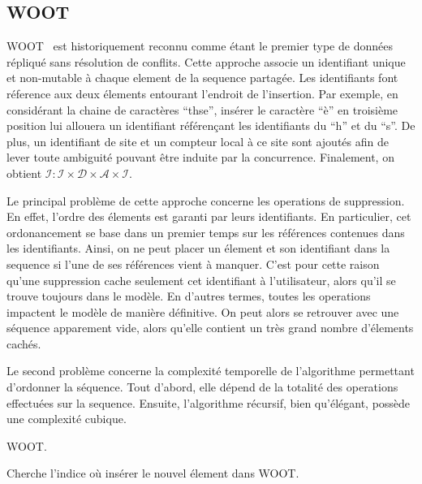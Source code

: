 
\subsection{WOOT}

WOOT~\cite{oster2006data} est historiquement reconnu comme étant le premier
type de données répliqué sans résolution de conflits. Cette approche associe un
identifiant unique et non-mutable à chaque element de la sequence partagée. Les
identifiants font réference aux deux élements entourant l'endroit de
l'insertion. Par exemple, en considérant la chaine de caractères ``thse'',
insérer le caractère ``è'' en troisième position lui allouera un identifiant
référençant les identifiants du ``h'' et du ``s''. De plus, un identifiant de
site et un compteur local à ce site sont ajoutés afin de lever toute ambiguité
pouvant être induite par la concurrence. Finalement, on obtient
$\mathcal{I}: \mathcal{I} \times \mathcal{D} \times \mathcal{A} \times
\mathcal{I}$.

Le principal problème de cette approche concerne les operations de suppression.
En effet, l'ordre des élements est garanti par leurs identifiants. En
particulier, cet ordonancement se base dans un premier temps sur les références
contenues dans les identifiants. Ainsi, on ne peut placer un élement et son
identifiant dans la sequence si l'une de ses références vient à manquer. C'est
pour cette raison qu'une suppression cache seulement cet identifiant à
l'utilisateur, alors qu'il se trouve toujours dans le modèle. En d'autres
termes, toutes les operations impactent le modèle de manière définitive. On
peut alors se retrouver avec une séquence apparement vide, alors qu'elle
contient un très grand nombre d'élements cachés.

Le second problème concerne la complexité temporelle de l'algorithme permettant
d'ordonner la séquence. Tout d'abord, elle dépend de la totalité des operations
effectuées sur la sequence. Ensuite, l'algorithme récursif, bien qu'élégant,
possède une complexité cubique.

\begin{algorithm}
  
  \caption{\label{algo:woot}WOOT.}
\end{algorithm}

\begin{algorithm}
  
  \caption{\label{algo:wootrecurs}Cherche l'indice où insérer le nouvel 
    élement dans WOOT.}
\end{algorithm}

